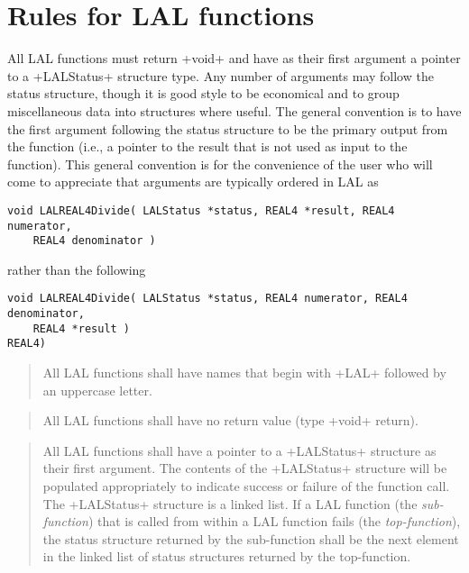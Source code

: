 \documentclass[10pt]{ligodcc}
\makeatletter
\def\verb{\relax\ifmmode\hbox\else\leavevmode\null\fi
  \bgroup
    \color{blue}\small
    \verb@eol@error \let\do\@makeother \dospecials
    \verbatim@font\@noligs
    \@ifstar\@sverb\@verb}
\newlength{\fminilength}
\newenvironment{fminipage}[1][\linewidth]
  {\setlength{\fminilength}{#1-2\fboxsep-2\fboxrule}%
   \begin{lrbox}{\fminibox}\begin{minipage}{\fminilength}}
  {\end{minipage}\end{lrbox}\noindent\fbox{\usebox{\fminibox}}}
\newenvironment{lalrule}{\begin{quote}\color{red}\begin{fminipage}}
  {\end{fminipage}\end{quote}}
\makeatother
\begin{document}
\section{Rules for LAL functions}

All LAL functions must return \verb+void+ and have as their first argument
a pointer to a \verb+LALStatus+ structure type.  Any number of arguments may
follow the status structure, though it is good style to be economical and to
group miscellaneous data into structures where useful.  The general convention
is to have the first argument following the status structure to be the primary
output from the function (i.e., a pointer to the result that is not used as
input to the function).  This general convention is for the convenience of the
user who will come to appreciate that arguments are typically ordered in LAL as
\begin{verbatim}
void LALREAL4Divide( LALStatus *status, REAL4 *result, REAL4 numerator,
    REAL4 denominator )
\end{verbatim}
rather than the following
\begin{verbatim}
void LALREAL4Divide( LALStatus *status, REAL4 numerator, REAL4 denominator,
    REAL4 *result )
REAL4)
\end{verbatim}
\begin{lalrule}
All LAL functions shall have names that begin with \verb+LAL+ followed by
an uppercase letter.
\end{lalrule}
\begin{lalrule}
All LAL functions shall have no return value (type \verb+void+ return).
\end{lalrule}
\begin{lalrule}
All LAL functions shall have a pointer to a \verb+LALStatus+ structure
as their first argument.  The contents of the \verb+LALStatus+ structure
will be populated appropriately to indicate success or failure of the
function call.  The \verb+LALStatus+ structure is a linked list.  If
a LAL function (the \emph{sub-function}) that is called from within a LAL
function fails (the \emph{top-function}), the status structure returned
by the sub-function shall be the next element in the linked list of status
structures returned by the top-function.
\end{lalrule}
\end{document}
